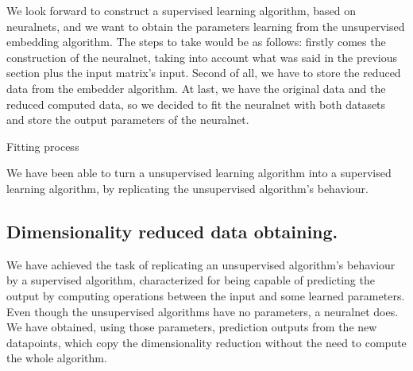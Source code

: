 \documentclass[a4paper,11pt,spanish]{report}
\makeatletter
\def\BState{\State\hskip-\ALG@thistlm}
\makeatother
\begin{document}
We look forward to construct a supervised learning algorithm, based on neuralnets, and we want to obtain the parameters learning from the unsupervised embedding algorithm. The steps to take would be as follows: firstly comes the construction of the neuralnet, taking into account what was said in the previous section plus the input matrix's input. Second of all, we have to store the reduced data from the embedder algorithm. At last, we have the original data and the reduced computed data, so we decided to fit the neuralnet with both datasets and store the output parameters of the neuralnet.
\vspace{10pt}

\begin{algorithm}
\caption{Fitting process}
\end{algorithm}

We have been able to turn a unsupervised learning algorithm into a supervised learning algorithm, by replicating the unsupervised algorithm's behaviour.

\subsection{Dimensionality reduced data obtaining.}
\label{ssec:trans}

We have achieved the task of replicating an unsupervised algorithm's behaviour by a supervised algorithm, characterized for being capable of predicting the output by computing operations between the input and some learned parameters.
Even though the unsupervised algorithms have no parameters, a neuralnet does. We have obtained, using those parameters, prediction outputs from the new datapoints, which copy the dimensionality reduction without the need to compute the whole algorithm.

\end{document}
